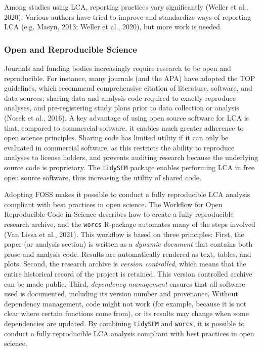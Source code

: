 \documentclass[
  ,man,floatsintext]{apa6}
\begin{document}
Among studies using LCA, reporting practices vary significantly
(Weller et al., 2020).
Various authors have tried to improve and
standardize ways of reporting LCA (e.g. Masyn, 2013; Weller et al., 2020), but more work is needed.

\hypertarget{open-and-reproducible-science}{%
\subsubsection{Open and Reproducible Science}\label{open-and-reproducible-science}}

Journals and funding bodies increasingly require research to be open and reproducible.
For instance, many journals (and the APA) have adopted the TOP guidelines, which recommend comprehensive citation of literature, software, and data sources;
sharing data and analysis code required to exactly reproduce analyses,
and pre-registering study plans prior to data collection or analysis (Nosek et al., 2016).
A key advantage of using open source software for LCA is that, compared to commercial software, it enables much greater adherence to open science principles.
Sharing code has limited utility if it can only be evaluated in commercial software,
as this restricts the ability to reproduce analyses to license holders,
and prevents auditing research because the underlying source code is proprietary.
The \texttt{tidySEM} package enables performing LCA in free open source software,
thus increasing the utility of shared code.

Adopting FOSS makes it possible to conduct a fully reproducible LCA analysis compliant with best practices in open science.
The Workflow for Open Reproducible Code in Science describes how to create a fully reproducible research archive,
and the \texttt{worcs} R-package automates many of the steps involved (Van Lissa et al., 2021).
This workflow is based on three principles: First,
the paper (or analysis section) is written as a \emph{dynamic document} that contains both prose and analysis code.
Results are automatically rendered as text, tables, and plots.
Second,
the research archive is \emph{version controlled}, which means that the entire historical record of the project is retained.
This version controlled archive can be made public.
Third, \emph{dependency management} ensures that all software used is documented, including its version number and provenance.
Without dependency management, code might not work (for example, because it is not clear where certain functions come from),
or its results may change when some dependencies are updated.
By combining \texttt{tidySEM} and \texttt{worcs},
it is possible to conduct a fully reproducible LCA analysis compliant with best practices in open science.
\end{document}
